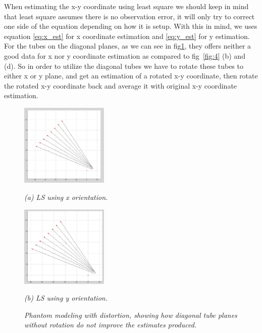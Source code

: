 When estimating the x-y coordinate using least square we should keep in mind that least square assumes
there is no observation error, it will only try to correct one side of the equation depending on how it
is setup. With this in mind, we uses equation \ref{eq:x_est} for x coordinate estimation and \ref{eq:y_est}
for y estimation. For the tubes on the diagonal planes, as we can see in fig\ref{fig:diagonal},
they offers neither a good data for x nor y coordinate estimation as compared to fig~\ref{fig:4} (b) and (d). So in order to utilize the diagonal
tubes we have to rotate these tubes to either x or y plane, and get an estimation of a rotated x-y
coordinate, then rotate the rotated x-y coordinate back and average it with original x-y coordinate
estimation.

\begin{figure}[htb]

  \begin{minipage}[b]{0.48\linewidth}
    \centering
    \centerline{\mbox{\includegraphics[width=1.65in]{isocenter/images/simulation/tube_plane_diagonal_using_x.eps}}}
    \centerline{\emph{(a) LS using x orientation.}}\medskip
  \end{minipage}
  \hfill
  \begin{minipage}[b]{0.48\linewidth}
    \centering
    \centerline{\mbox{\includegraphics[width=1.65in]{isocenter/images/simulation/tube_plane_diagonal_using_y.eps}}}
    \centerline{\emph{(b) LS using y orientation.}}\medskip
  \end{minipage}
\caption{\emph{Phantom modeling with distortion, showing how diagonal tube planes without rotation do not improve the estimates produced.}} \label{fig:diagonal}
%
\end{figure}

